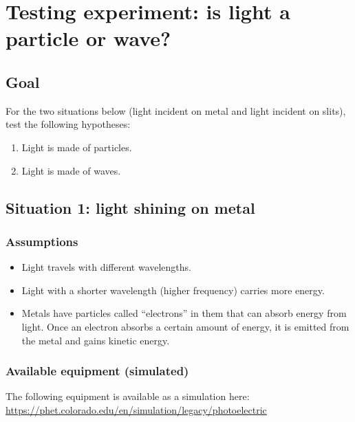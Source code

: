 \section{Testing experiment: is light a particle or wave?}

\subsection{Goal}

For the two situations below (light incident on metal and light incident on slits), test the following hypotheses:
\begin{enumerate}[label=(\Alph*)]
	\item\label{lpw:hyp:part} Light is made of particles.
	\item\label{lpw:hyp:wave} Light is made of waves.
\end{enumerate}

\subsection{Situation 1: light shining on metal}

\subsubsection{Assumptions}

\begin{itemize}
	\item Light travels with different wavelengths.
	
	\item Light with a shorter wavelength (higher frequency) carries more energy.
	
	\item Metals have particles called ``electrons'' in them that can absorb energy from light. Once an electron absorbs a certain amount of energy, it is emitted from the metal and gains kinetic energy.
\end{itemize}

\subsubsection{Available equipment (simulated)}

The following equipment is available as a simulation here: \url{https://phet.colorado.edu/en/simulation/legacy/photoelectric}

